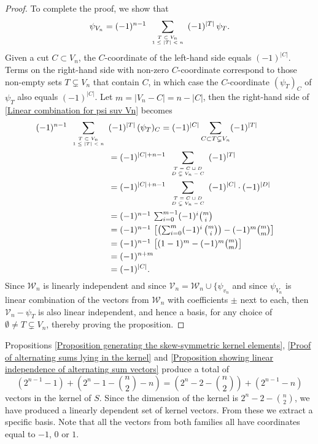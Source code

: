 \documentclass[12pt]{amsart}
\numberwithin{theorem}{section}
\theoremstyle{remark}
\begin{document}
\begin{proof}
To complete the proof, we show that 
\begin{equation} \label{Linear combination for psi suv Vn}
\psi_{V_n} = (-1)^{n-1} \sum _{\tiny 
\begin{array}{c} T\subset V_n \cr 1\le |T|<n\end{array}} (-1)^{|T|}\, \psi_T. 
\end{equation}
Given a cut $C\subset V_n$, the $C$-coordinate of the left-hand side equals $(-1)^{|C|}$. Terms on the right-hand side with non-zero $C$-coordinate correspond to those non-empty sets $T\subsetneq V_n$ that contain $C$, in which case the $C$-coordinate $(\psi_T)_C$ of $\psi_T$ also equals $(-1)^{|C|}$. Let $m=|V_n-C| = n-|C|$, then the right-hand side of \eqref{Linear combination for psi suv Vn} becomes   
\begin{align*}
(-1)^{n-1} \sum _{\tiny 
\begin{array}{c} T\subset V_n \cr 1\le |T|<n\end{array}}& (-1)^{|T|}\, (\psi_T)_C  = (-1)^{|C|} \sum _{C\subset T\subsetneq V_n} (-1)^{|T|} \cr
&  = (-1)^{|C|+n-1} \sum _{\tiny \begin{array}{c} T=C\sqcup D\cr D\subsetneq V_n-C\end{array}} (-1)^{|T|}  \cr
&  = (-1)^{|C|+n-1} \sum _{\tiny \begin{array}{c} T=C\sqcup D\cr D\subsetneq V_n-C\end{array}} (-1)^{|C|}\cdot (-1)^{|D|}  \cr
& \textstyle = (-1)^{n-1}\, \sum _{i=0}^{m-1} (-1)^i {m\choose i} \cr
& \textstyle  = (-1)^{n-1}\, \left[\left(\sum _{i=0}^{m} (-1)^i\, {m\choose i}\right) -(-1)^m {m\choose m}\right]  \cr
& \textstyle  = (-1)^{n-1}\, \left[ (1-1)^m -(-1)^m {m\choose m} \right] \cr
& = (-1)^{n+m}  \cr
& = (-1)^{|C|}.
\end{align*}
Since $\mathcal W_n$ is linearly independent and since $\mathcal V_n = \mathcal W_n \cup \{\psi_{v_n}$ and since $\psi_{V_n}$ is linear combination of the vectors from $\mathcal W_n$ with coefficients $\pm$ next to each, then $\mathcal V_n - \psi_T$ is also linear independent, and hence a basis, for any choice of $\emptyset \ne T\subsetneq V_n$, thereby proving the proposition. 
\end{proof}
Propositions \ref{Proposition generating the skew-symmetric kernel elements}, \ref{Proof of alternating sums lying in the kernel} and \ref{Proposition showing linear independence of alternating sum vectors} produce a total of 
%
$$ \left( 2^{n-1}-1 \right) + \left( 2^n-1-{n\choose 2}-n \right) = \left( 2^n-2 -{n \choose 2}\right)  + \left(2^{n-1}-n \right) $$ 
%
vectors in the kernel of $S$. Since the dimension of the kernel is $2^n-2 -{n\choose 2}$, we have produced a linearly dependent set of kernel vectors. From these we extract a specific basis. Note that all the vectors from both families all have coordinates equal to $-1$, $0$ or $1$. 
\end{document}
